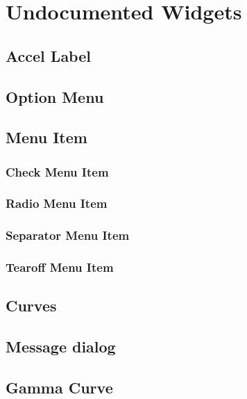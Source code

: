 \chapter{Undocumented Widgets}
\section{Accel Label}
\section{Option Menu}
\section{Menu Item}
	\subsection{Check Menu Item}
	\subsection{Radio Menu Item}
	\subsection{Separator Menu Item}
	\subsection{Tearoff Menu Item}
\section{Curves}
\section{Message dialog}
\section{Gamma Curve}
